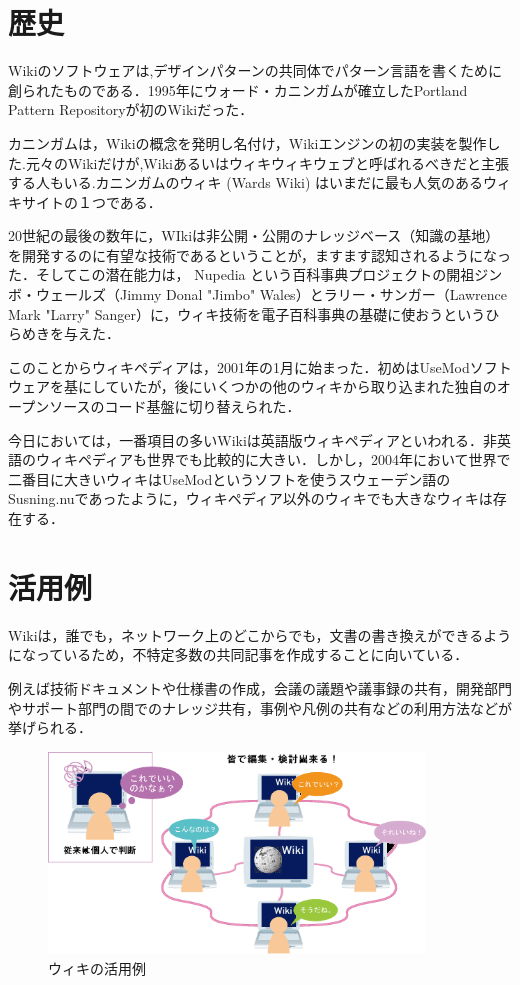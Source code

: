 \section{歴史}
Wikiのソフトウェアは,デザインパターンの共同体でパターン言語を書くために創られたものである．1995年にウォード・カニンガムが確立したPortland Pattern Repositoryが初のWikiだった．

カニンガムは，Wikiの概念を発明し名付け，Wikiエンジンの初の実装を製作した.元々のWikiだけが,Wikiあるいはウィキウィキウェブと呼ばれるべきだと主張する人もいる.カニンガムのウィキ (Wards Wiki) はいまだに最も人気のあるウィキサイトの１つである．

20世紀の最後の数年に，WIkiは非公開・公開のナレッジベース（知識の基地）を開発するのに有望な技術であるということが，ますます認知されるようになった．そしてこの潜在能力は， Nupedia という百科事典プロジェクトの開祖ジンボ・ウェールズ（Jimmy Donal "Jimbo" Wales）とラリー・サンガー（Lawrence Mark "Larry" Sanger）に，ウィキ技術を電子百科事典の基礎に使おうというひらめきを与えた．

このことからウィキペディアは，2001年の1月に始まった．初めはUseModソフトウェアを基にしていたが，後にいくつかの他のウィキから取り込まれた独自のオープンソースのコード基盤に切り替えられた．

今日においては，一番項目の多いWikiは英語版ウィキペディアといわれる．非英語のウィキペディアも世界でも比較的に大きい．しかし，2004年において世界で二番目に大きいウィキはUseModというソフトを使うスウェーデン語のSusning.nuであったように，ウィキペディア以外のウィキでも大きなウィキは存在する．\cite{wiki}
\section{活用例}
Wikiは，誰でも，ネットワーク上のどこからでも，文書の書き換えができるようになっているため，不特定多数の共同記事を作成することに向いている．

例えば技術ドキュメントや仕様書の作成，会議の議題や議事録の共有，開発部門やサポート部門の間でのナレッジ共有，事例や凡例の共有などの利用方法などが挙げられる．\cite{wikiwiki}

\begin{figure}[htb]
\centering
\includegraphics[width=10cm]{img_wiki03.png}
\caption{ウィキの活用例}\label{図}
\end{figure}




